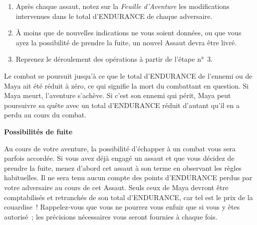 \documentclass[10pt]{book}
\begin{document}
\begin{enumerate}
  \item Après chaque assaut, notez sur la \textit{Feuille d'Aventure} les modifications
  intervenues dans le total d'ENDURANCE de chaque adversaire.

  \item À moins que de nouvelles indications ne vous soient données, ou que vous
  ayez la possibilité de prendre la fuite, un nouvel Assaut devra être livré.

  \item Reprenez le déroulement des opérations à partir de l'étape n°~3.
\end{enumerate}

Le combat se poursuit jusqu'à ce que le total d'ENDURANCE de l'ennemi ou de Maya
ait été réduit à zéro, ce qui signifie la mort du combattant en question. Si Maya
meurt, l'aventure s'achève. Si c'est son ennemi
qui périt, Maya peut poursuivre sa quête avec un total d'ENDURANCE réduit d'autant
qu'il en a perdu au cours du combat.

\newpage

\begin{center}
  \textbf{Possibilités de fuite}
\end{center}
Au cours de votre aventure, la possibilité d'échapper à un combat vous sera parfois
accordée. Si vous avez déjà engagé un assaut et que vous décidez de prendre la fuite,
menez d'abord cet assaut à son terme en observant les règles habituelles.
Il ne sera tenu aucun compte des points d'ENDURANCE perdus par votre adversaire au cours
de cet Assaut. 
Seuls ceux de Maya devront être comptabilisés et retranchés de son total d'ENDURANCE,
car tel est le prix de la couardise~! Rappelez-vous que vous ne pourrez vous enfuir que
si vous y êtes autorisé~; les précisions nécessaires vous seront fournies à chaque fois.


\mainmatter
\pagestyle{mainmatterstyle}

\end{document}
